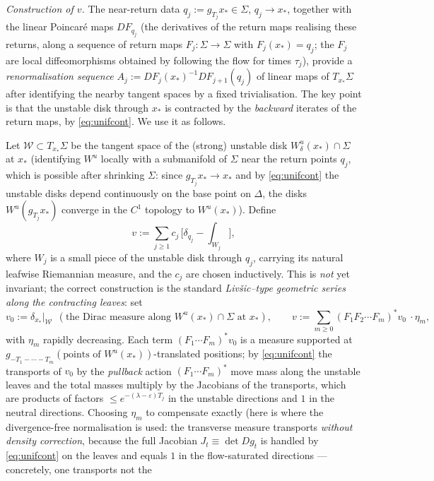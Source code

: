 \documentclass[11pt]{amsart}
\theoremstyle{plain}
\theoremstyle{definition}
\theoremstyle{remark}
\begin{document}
\emph{Construction of $v$.}  The near-return data
$q_j:=g_{T_j}x_*\in\Sigma$, $q_j\to x_*$, together with the linear
Poincaré maps $DF_{q_j}$ (the derivatives of the return maps
realising these returns, along a sequence of return maps
$F_j:\Sigma\to\Sigma$ with $F_j(x_*)=q_j$; the $F_j$ are local
diffeomorphisms obtained by following the flow for times
$\tau_j$), provide a \emph{renormalisation sequence}
$A_j:=DF_j(x_*)^{-1}DF_{j+1}(q_j)$ of linear maps of
$T_{x_*}\Sigma$ after identifying the nearby tangent spaces by a
fixed trivialisation.  The key point is that the unstable disk
through $x_*$ is contracted by the \emph{backward} iterates of the
return maps, by \eqref{eq:unifcont}.  We use it as follows.

Let $\mathcal{W}\subset T_{x_*}\Sigma$ be the tangent space of the
(strong) unstable disk $W^u_\delta(x_*)\cap\Sigma$ at $x_*$
(identifying $W^u$ locally with a submanifold of $\Sigma$ near the
return points $q_j$, which is possible after shrinking $\Sigma$:
since $g_{T_j}x_*\to x_*$ and by \eqref{eq:unifcont} the unstable
disks depend continuously on the base point on $\Delta$, the disks
$W^u(g_{T_j}x_*)$ converge in the $C^1$ topology to $W^u(x_*)$).
Define
\[
v:=\sum_{j\ge1} c_j\,\bigl[\delta_{q_j}-\textstyle
\int_{W_j}\bigr],
\]
where $W_j$ is a small piece of the unstable disk through $q_j$,
carrying its natural leafwise Riemannian measure, and the $c_j$ are
chosen inductively.  This is \emph{not} yet invariant; the correct
construction is the standard \emph{Liv\v{s}ic--type geometric
series along the contracting leaves}: set
\[
v_0:=\delta_{x_*}\big|_{\mathcal{W}}\ \ (\text{the Dirac measure
along }W^u(x_*)\cap\Sigma\text{ at }x_*),
\qquad v:=\sum_{m\ge0} (F_1F_2\cdots F_m)^*\!v_0\ \cdot\eta_m,
\]
with $\eta_m$ rapidly decreasing.  Each term
$(F_1\cdots F_m)^*v_0$ is a measure supported at
$g_{-T_1-\cdots-T_m}(\text{points of }W^u(x_*))$-translated
positions; by \eqref{eq:unifcont} the transports of $v_0$ by the
\emph{pullback} action $(F_1\cdots F_m)^*$ move mass along the
unstable leaves and the total masses multiply by the Jacobians of
the transports, which are products of factors $\le
e^{-(\lambda-\varepsilon)T_j}$ in the unstable directions and $1$ in
the neutral directions.  Choosing $\eta_m$ to compensate exactly
(here is where the divergence-free normalisation is used: the
transverse measure transports \emph{without density correction},
because the full Jacobian $J_t\equiv\det Dg_t$ is handled by
\eqref{eq:unifcont} on the leaves and equals $1$ in the
flow-saturated directions --- concretely, one transports not the
\end{document}
